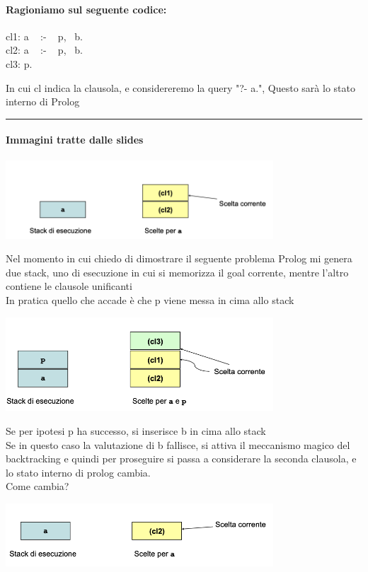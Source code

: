 \documentclass[12pt, a4paper, openany, oneside]{book}
\begin{document}
\paragraph{Ragioniamo sul seguente codice:}
\begin{center}
cl1: a ~ :- ~ p,~ b. \\
cl2: a ~ :- ~ p,~ b. \\
cl3: p.
\end{center}
In cui cl indica la clausola, e considereremo la query "?- a.", Questo sarà
lo stato interno di Prolog
\\
{\color{black} \rule{\linewidth}{0.3mm}}
\paragraph{Immagini tratte dalle slides}
\begin{center}
\includegraphics[width=0.75\textwidth]{3}
\end{center}
Nel momento in cui chiedo di dimostrare il seguente problema Prolog mi genera
due stack, uno di esecuzione in cui si memorizza il goal corrente, mentre 
l'altro contiene le clausole unificanti \\
In pratica quello che accade è che p viene messa in cima allo stack
\begin{center}
\includegraphics[width=0.75\textwidth]{4}
\end{center}
Se per ipotesi p ha successo, si inserisce b in cima allo stack\\
Se in questo caso la valutazione di b fallisce, si attiva il meccanismo magico
del \color{red} backtracking \color{black} e quindi per proseguire si passa a
considerare la seconda clausola, e lo stato interno di prolog cambia. \\
Come cambia?
\begin{center}
\includegraphics[width=0.75\textwidth]{5}
\end{center}
\end{document}
